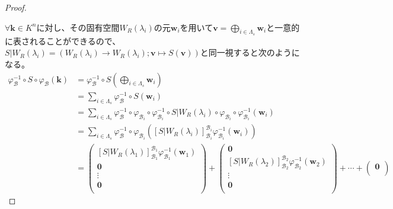 \documentclass[dvipdfmx]{jsarticle}
\begin{document}
\begin{proof}
\begin{center}
\begin{tikzpicture}[auto]
  \end{tikzpicture} 
\end{center}
$\forall\mathbf{k} \in K^{n}$に対し、その固有空間$W_{R}\left( \lambda_{i} \right)$の元$\mathbf{w}_{i}$を用いて$\mathbf{v} = \bigoplus_{i \in \varLambda_{s}} \mathbf{w}_{i}$と一意的に表されることができるので、$S|W_{R}\left( \lambda_{i} \right) = \left( W_{R}\left( \lambda_{i} \right) \rightarrow W_{R}\left( \lambda_{i} \right);\mathbf{v} \mapsto S\left( \mathbf{v} \right) \right)$と同一視すると次のようになる。
\begin{align*}
\varphi_{\mathcal{B}}^{- 1} \circ S \circ \varphi_{\mathcal{B}}\left( \mathbf{k} \right) &= \varphi_{\mathcal{B}}^{- 1} \circ S\left( \bigoplus_{i \in \varLambda_{s}} \mathbf{w}_{i} \right) \\
&= \sum_{i \in \varLambda_{s}} {\varphi_{\mathcal{B}}^{- 1} \circ S\left( \mathbf{w}_{i} \right)} \\
&= \sum_{i \in \varLambda_{s}} {\varphi_{\mathcal{B}}^{- 1} \circ \varphi_{\mathcal{B}_{i}} \circ \varphi_{\mathcal{B}_{i}}^{- 1} \circ S|W_{R}\left( \lambda_{i} \right) \circ \varphi_{\mathcal{B}_{i}} \circ \varphi_{\mathcal{B}_{i}}^{- 1}\left( \mathbf{w}_{i} \right)} \\
&= \sum_{i \in \varLambda_{s}} {\varphi_{\mathcal{B}}^{- 1} \circ \varphi_{\mathcal{B}_{i}}\left( \left[S|W_{R}\left( \lambda_{i} \right) \right]_{\mathcal{B}_{i}}^{\mathcal{B}_{i}}\varphi_{\mathcal{B}_{i}}^{- 1}\left( \mathbf{w}_{i} \right) \right)} \\
&= \begin{pmatrix}
\left[S|W_{R}\left( \lambda_{1} \right) \right]_{\mathcal{B}_{1}}^{\mathcal{B}_{1}}\varphi_{\mathcal{B}_{1}}^{- 1}\left( \mathbf{w}_{1} \right) \\
\mathbf{0} \\
 \vdots \\
\mathbf{0} \\
\end{pmatrix} + \begin{pmatrix}
\mathbf{0} \\
\left[S|W_{R}\left( \lambda_{2} \right) \right]_{\mathcal{B}_{2}}^{\mathcal{B}_{2}}\varphi_{\mathcal{B}_{2}}^{- 1}\left( \mathbf{w}_{2} \right) \\
 \vdots \\
\mathbf{0} \\
\end{pmatrix} + \cdots + \begin{pmatrix}
\mathbf{0} \\

\end{pmatrix}
\end{align*}
\end{proof}
\end{document}
